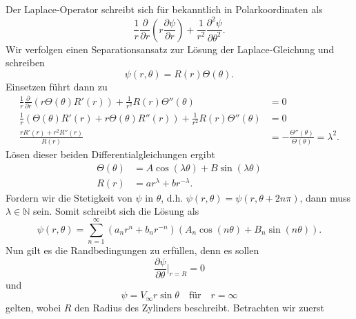 \documentclass[12pt]{exam}
\newcommand{\del}{\partial}
\begin{document}
\begin{questions}
    \begin{solution}
        Der Laplace-Operator schreibt sich für bekanntlich in Polarkoordinaten als
        \begin{equation*}
            \frac{1}{r} \frac{\del}{\del r} \left( r \frac{\del \psi}{\del r} \right) + \frac{1}{r^2} \frac{\del^2 \psi}{\del \theta^2}.
        \end{equation*}
        Wir verfolgen einen Separationsansatz zur Lösung der Laplace-Gleichung und schreiben
        \begin{equation*}
            \psi(r, \theta) = R(r) \Theta(\theta).
        \end{equation*}
        Einsetzen führt dann zu
        \begin{align*}
            \frac{1}{r} \frac{\del}{\del r} \left( r \Theta(\theta) R'(r) \right) + \frac{1}{r^2} R(r) \Theta''(\theta) &= 0 \\
            \frac{1}{r} \left( \Theta(\theta) R'(r) + r \Theta(\theta) R''(r) \right) + \frac{1}{r^2} R(r) \Theta''(\theta) &= 0 \\
            \frac{r R'(r) + r^2 R''(r)}{R(r)} &= -\frac{\Theta''(\theta)}{\Theta(\theta)} = \lambda^2.
        \end{align*}
        Lösen dieser beiden Differentialgleichungen ergibt
        \begin{align*}
            \Theta(\theta) &= A \cos(\lambda \theta) + B \sin(\lambda \theta) \\
            R(r) &= a r^{\lambda} + b r^{-\lambda}.
        \end{align*}
        Fordern wir die Stetigkeit von $\psi$ in $\theta$, d.h. $\psi(r, \theta) = \psi(r, \theta + 2 n \pi)$, dann muss $\lambda \in \mathbb{N}$ sein. Somit schreibt sich die Lösung als
        \begin{equation*}
            \psi(r, \theta) = \sum_{n=1}^{\infty} (a_n r^n + b_n r^{-n})(A_n \cos(n \theta) + B_n \sin(n \theta)).
        \end{equation*}
        Nun gilt es die Randbedingungen zu erfüllen, denn es sollen
        \begin{equation*}
            \frac{\del \psi}{\del \theta} \vert_{r=R} = 0
        \end{equation*}
        und
        \begin{equation*}
            \psi = V_{\infty} r \sin \theta \quad \text{für} \quad r = \infty
        \end{equation*}
        gelten, wobei $R$ den Radius des Zylinders beschreibt. Betrachten wir zuerst

\end{solution}
\end{questions}
\end{document}

